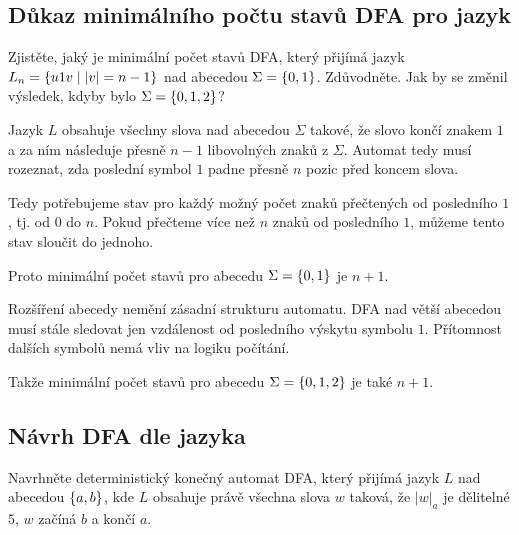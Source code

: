 
\subsection{Důkaz minimálního počtu stavů DFA pro jazyk}
Zjistěte, jaký je minimální počet stavů DFA, který přijímá jazyk $L_n = \left\lbrace u1v \mid |v|=n-1 \right\rbrace$ nad abecedou
$\Sigma = \left\lbrace 0,1 \right\rbrace$. Zdůvodněte. Jak by se změnil výsledek, kdyby bylo $\Sigma = \left\lbrace 0,1,2 \right\rbrace$?
\newline

Jazyk $L$ obsahuje všechny slova nad abecedou $\Sigma$ takové, že slovo končí znakem $1$ a za ním následuje přesně $n-1$
libovolných znaků z $\Sigma$. Automat tedy musí rozeznat, zda poslední symbol $1$ padne přesně $n$ pozic před koncem
slova.

Tedy potřebujeme stav pro každý možný počet znaků přečtených od posledního $1$, tj. od 0 do $n$. Pokud přečteme více než
$n$ znaků od posledního $1$, můžeme tento stav sloučit do jednoho.

Proto minimální počet stavů pro abecedu $\Sigma = \left\lbrace 0,1 \right\rbrace$ je $n+1$.

Rozšíření abecedy nemění zásadní strukturu automatu. DFA nad větší abecedou musí stále sledovat jen vzdálenost od
posledního výskytu symbolu $1$. Přítomnost dalších symbolů nemá vliv na logiku počítání.

Takže minimální počet stavů pro abecedu $\Sigma = \left\lbrace 0,1,2 \right\rbrace$ je také $n+1$.

\subsection{Návrh DFA dle jazyka}
Navrhněte deterministický konečný automat DFA, který přijímá jazyk $L$ nad abecedou $\left\lbrace a,b \right\rbrace$, kde $L$ obsahuje právě
všechna slova $w$ taková, že $|w|_a$ je dělitelné $5$, $w$ začíná $b$ a končí $a$.

